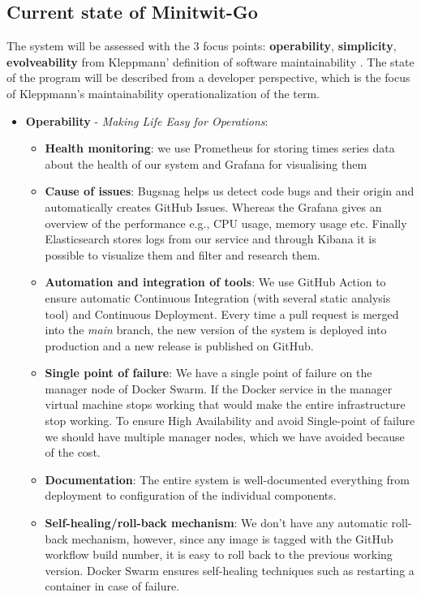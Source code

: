 \subsection{Current state of Minitwit-Go}
The system will be assessed with the 3 focus points: \textbf{operability}, \textbf{simplicity}, \textbf{evolveability} from Kleppmann' definition of software maintainability \cite{Kleppmann17}. The state of the program will be described from a developer perspective, which is the focus of Kleppmann's maintainability operationalization of the term. 

\begin{itemize}
    \item \textbf{Operability} - \textit{Making Life Easy for Operations}:
    \begin{itemize}
        \item \textbf{Health monitoring}: we use Prometheus for storing times series data about the health of our system and Grafana for visualising them
        \item \textbf{Cause of issues}: Bugsnag helps us detect code bugs and their origin and automatically creates GitHub Issues. Whereas the Grafana gives an overview of the performance e.g., CPU usage, memory usage etc. Finally Elasticsearch stores logs from our service and through Kibana it is possible to visualize them and filter and research them.
        \item \textbf{Automation and integration of tools}: We use GitHub Action to ensure automatic Continuous Integration (with several static analysis tool) and Continuous Deployment. Every time a pull request is merged into the \textit{main} branch, the new version of the system is deployed into production and a new release is published on GitHub.
        \item \textbf{Single point of failure}: We have a single point of failure on the manager node of Docker Swarm. If the Docker service in the manager virtual machine stops working that would make the entire infrastructure stop working. To ensure High Availability and avoid Single-point of failure we should have multiple manager nodes, which we have avoided because of the cost. 
        \item \textbf{Documentation}: The entire system is well-documented everything from deployment to configuration of the individual components. 
        \item \textbf{Self-healing/roll-back mechanism}: We don't have any automatic roll-back mechanism, however, since any image is tagged with the GitHub workflow build number, it is easy to roll back to the previous working version. Docker Swarm ensures self-healing techniques such as restarting a container in case of failure.

\end{itemize}
\end{itemize}
